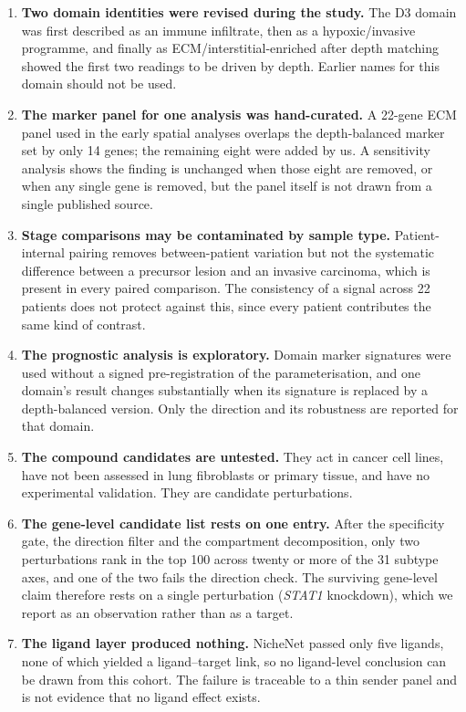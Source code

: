 \begin{enumerate}
\item \textbf{Two domain identities were revised during the study.} The D3 domain was
first described as an immune infiltrate, then as a hypoxic/invasive programme, and finally
as ECM/interstitial-enriched after depth matching showed the first two readings to be
driven by depth. Earlier names for this domain should not be used.

\item \textbf{The marker panel for one analysis was hand-curated.} A 22-gene ECM panel
used in the early spatial analyses overlaps the depth-balanced marker set by only 14
genes; the remaining eight were added by us. A sensitivity analysis shows the finding is
unchanged when those eight are removed, or when any single gene is removed, but the panel
itself is not drawn from a single published source.

\item \textbf{Stage comparisons may be contaminated by sample type.} Patient-internal
pairing removes between-patient variation but not the systematic difference between a
precursor lesion and an invasive carcinoma, which is present in every paired comparison.
The consistency of a signal across 22 patients does not protect against this, since every
patient contributes the same kind of contrast.

\item \textbf{The prognostic analysis is exploratory.} Domain marker signatures were used
without a signed pre-registration of the parameterisation, and one domain's result changes
substantially when its signature is replaced by a depth-balanced version. Only the
direction and its robustness are reported for that domain.

\item \textbf{The compound candidates are untested.} They act in cancer cell lines, have
not been assessed in lung fibroblasts or primary tissue, and have no experimental
validation. They are candidate perturbations.

\item \textbf{The gene-level candidate list rests on one entry.} After the specificity gate,
the direction filter and the compartment decomposition, only two perturbations rank in the
top 100 across twenty or more of the 31 subtype axes, and one of the two fails the
direction check. The surviving gene-level claim therefore rests on a single perturbation
(\emph{STAT1} knockdown), which we report as an observation rather than as a target.

\item \textbf{The ligand layer produced nothing.} NicheNet passed only five ligands, none of
which yielded a ligand--target link, so no ligand-level conclusion can be drawn from this
cohort. The failure is traceable to a thin sender panel and is not evidence that no ligand
effect exists.


\end{enumerate}
